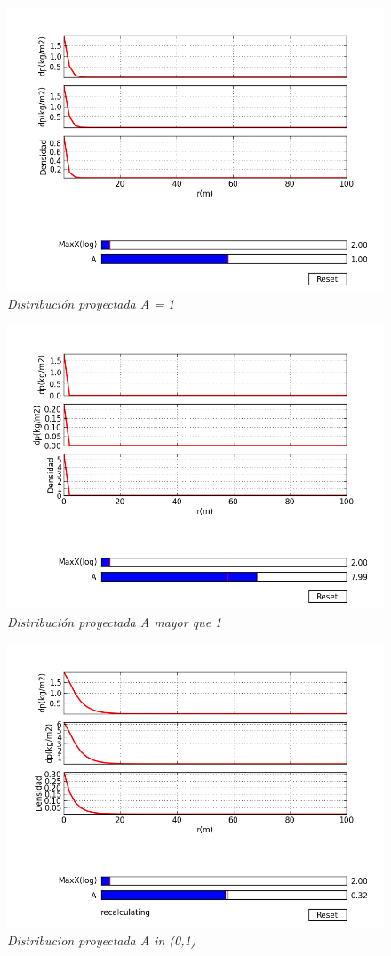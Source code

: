 \documentclass[12pt]{book}
\begin{document}
\begin{figure}[!h]
 \centering
 \includegraphics[scale=0.7]{dp1.png}
 \caption{\emph{Distribución proyectada A = 1}}
 \label{Fig: 1}
\end{figure}


\begin{figure}[!h]
 \centering
 \includegraphics[scale=0.7]{dp2.png}
 \caption{\emph{Distribución proyectada A mayor que 1}}
 \label{Fig: 1}
\end{figure}

\begin{figure}[!h]
 \centering
 \includegraphics[scale=0.7]{dp3.png}
 \caption{\emph{Distribucion proyectada A in (0,1) }}
 \label{Fig: 1}
\end{figure}
\end{document}
